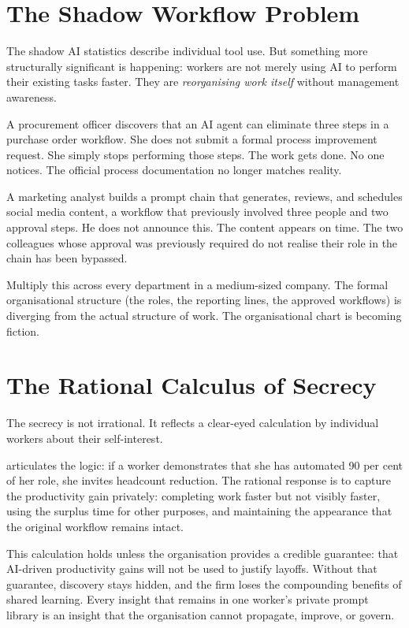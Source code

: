 \section{The Shadow Workflow Problem}

The shadow AI statistics describe individual tool use. But something more structurally significant is happening: workers are not merely using AI to perform their existing tasks faster. They are \emph{reorganising work itself} without management awareness.

A procurement officer discovers that an AI agent can eliminate three steps in a purchase order workflow. She does not submit a formal process improvement request. She simply stops performing those steps. The work gets done. No one notices. The official process documentation no longer matches reality.

A marketing analyst builds a prompt chain that generates, reviews, and schedules social media content, a workflow that previously involved three people and two approval steps. He does not announce this. The content appears on time. The two colleagues whose approval was previously required do not realise their role in the chain has been bypassed.

Multiply this across every department in a medium-sized company. The formal organisational structure (the roles, the reporting lines, the approved workflows) is diverging from the actual structure of work. The organisational chart is becoming fiction.

\section{The Rational Calculus of Secrecy}

The secrecy is not irrational. It reflects a clear-eyed calculation by individual workers about their self-interest.

\textcite{Mollick2023SecretCyborgs} articulates the logic: if a worker demonstrates that she has automated 90 per cent of her role, she invites headcount reduction. The rational response is to capture the productivity gain privately: completing work faster but not visibly faster, using the surplus time for other purposes, and maintaining the appearance that the original workflow remains intact.

This calculation holds unless the organisation provides a credible guarantee: that AI-driven productivity gains will not be used to justify layoffs. Without that guarantee, discovery stays hidden, and the firm loses the compounding benefits of shared learning. Every insight that remains in one worker's private prompt library is an insight that the organisation cannot propagate, improve, or govern.

